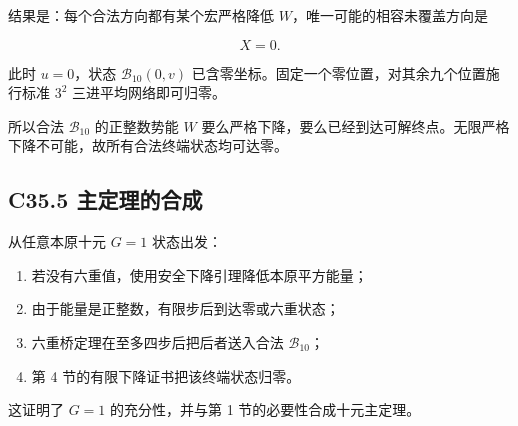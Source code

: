 \documentclass[11pt,a4paper]{article}
\newcommand{\tightlist}{\setlength{\itemsep}{0pt}\setlength{\parskip}{0pt}}
\theoremstyle{definition}
\numberwithin{equation}{section}
\begin{document}
{结果是：每个合法方向都有某个宏严格降低} \(W\){，唯一可能的相容未覆盖方向是}

\[
X=0.
\]

{此时} \(u=0\){，状态} \(\mathcal B_{10}(0,v)\) {已含零坐标。固定一个零位置，对其余九个位置施行标准} \(3^2\) {三进平均网络即可归零。}

{所以合法} \(\mathcal B_{10}\) {的正整数势能} \(W\) {要么严格下降，要么已经到达可解终点。无限严格下降不可能，故所有合法终端状态均可达零。}

\subsection*{\texorpdfstring{{C35.5} {主定理的合成}}{C35.5 主定理的合成}}\label{C35-h240}

{从任意本原十元} \(G=1\) {状态出发：}

\begin{enumerate}
\def\labelenumi{\arabic{enumi}.}
\tightlist
\item
  {若没有六重值，使用安全下降引理降低本原平方能量；}
\item
  {由于能量是正整数，有限步后到达零或六重状态；}
\item
  {六重桥定理在至多四步后把后者送入合法} \(\mathcal B_{10}\){；}
\item
  {第} {4} {节的有限下降证书把该终端状态归零。}
\end{enumerate}

{这证明了} \(G=1\) {的充分性，并与第} {1} {节的必要性合成十元主定理。}
\end{document}
